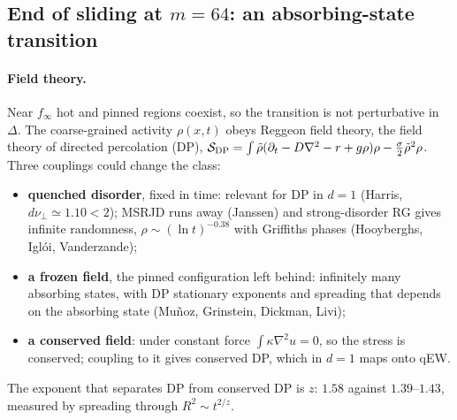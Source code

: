 \documentclass[10pt,a4paper]{article}
\begin{document}
\subsection{End of sliding at $m=64$: an absorbing-state transition}
\label{sec:patchy}

\paragraph{Field theory.} Near $f_\infty$ hot and pinned regions coexist, so the transition is not perturbative in $\Delta$. The coarse-grained activity $\rho(x,t)$ obeys Reggeon field theory, the field theory of directed percolation (DP), $\mathcal S_{\rm DP}=\int\tilde\rho(\partial_t-D\nabla^2-r+g\rho)\rho-\frac\sigma2\tilde\rho^2\rho$. Three couplings could change the class:
\begin{itemize}
\item \textbf{quenched disorder}, fixed in time: relevant for DP in $d=1$ (Harris, $d\nu_\perp\simeq1.10<2$); MSRJD runs away (Janssen) and strong-disorder RG gives infinite randomness, $\rho\sim(\ln t)^{-0.38}$ with Griffiths phases (Hooyberghs, Igl\'oi, Vanderzande);
\item \textbf{a frozen field}, the pinned configuration left behind: infinitely many absorbing states, with DP stationary exponents and spreading that depends on the absorbing state (Mu\~noz, Grinstein, Dickman, Livi);
\item \textbf{a conserved field}: under constant force $\int\kappa\nabla^2u=0$, so the stress is conserved; coupling to it gives conserved DP, which in $d=1$ maps onto qEW.
\end{itemize}
The exponent that separates DP from conserved DP is $z$: $1.58$ against $1.39$--$1.43$, measured by spreading through $R^2\sim t^{2/z}$.
\end{document}
